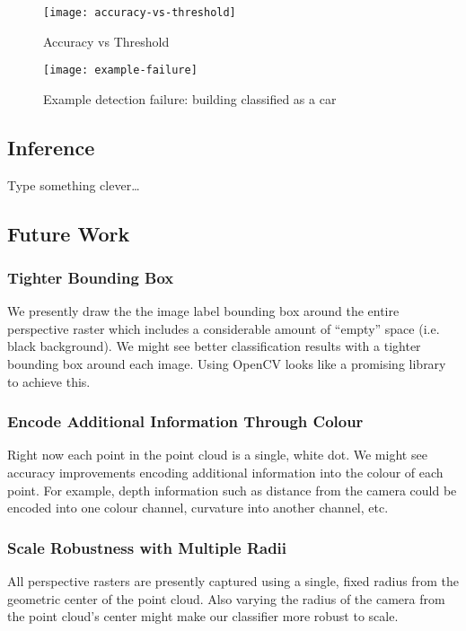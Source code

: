 \documentclass[runningheads,a4paper]{llncs}
\begin{document}
\begin{figure}[h]
  \caption{Accuracy vs Threshold}
  \centering
  \texttt{[image: accuracy-vs-threshold]}
  \label{fig:accuracy-vs-threshold}
\end{figure}

\begin{figure}[h]
  \caption{Example detection failure: building classified as a car}
  \centering
  \texttt{[image: example-failure]}
  \label{fig:example-failure}
\end{figure}

\subsection{Inference}
Type something clever\dots

\subsection{Future Work}
\subsubsection{Tighter Bounding Box}
We presently draw the the image label bounding box around the entire perspective
raster which includes a considerable amount of “empty” space (i.e. black
background). We might see better classification results with a tighter bounding
box around each image. Using OpenCV looks like a promising library to achieve
this.

\subsubsection{Encode Additional Information Through Colour}
Right now each point in the point cloud is a single, white dot. We might see
accuracy improvements encoding additional information into the colour of each
point. For example, depth information such as distance from the camera could be
encoded into one colour channel, curvature into another channel, etc.

\subsubsection{Scale Robustness with Multiple Radii}
All perspective rasters are presently captured using a single, fixed radius
from the geometric center of the point cloud. Also varying the radius of the
camera from the point cloud’s center might make our classifier more robust to
scale. 
\end{document}
